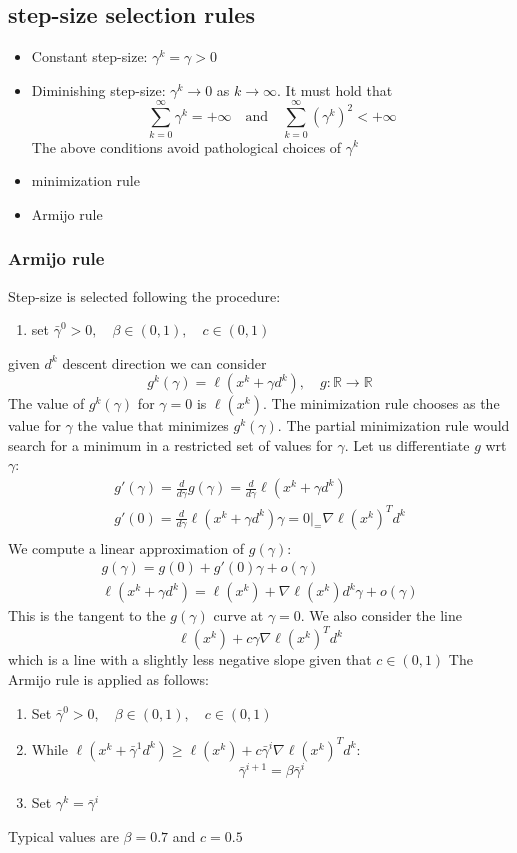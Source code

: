 \documentclass{book}
\newcommand\at[2]{\left.#1\right|_{#2}}
\newcommand{\R}{\mathbb{R}}
\theoremstyle{definition}
\theoremstyle{remark}
\theoremstyle{remark}
\begin{document}
\subsection{step-size selection rules}
\begin{itemize}
    \item Constant step-size: $\gamma^k=\gamma>0$
    \item Diminishing step-size: $\gamma^k\to 0$ as $k\to\infty$. It must hold that \[
            \displaystyle\sum_{k=0}^{\infty}\gamma^k = +\infty \quad \text{and} \quad \displaystyle\sum_{k=0}^{\infty}(\gamma^k)^2 < +\infty
        \]
        The above conditions avoid pathological choices of $\gamma^k$
    \item minimization rule
    \item Armijo rule
\end{itemize}

\subsubsection{Armijo rule}
Step-size is selected following the procedure: 
\begin{enumerate}
    \item set $\bar{\gamma}^0>0,\quad \beta\in(0,1),\quad c\in(0,1)$
\end{enumerate}
given $d^k$ descent direction we can consider 
\[
    g^k(\gamma) = \ell(x^k+\gamma d^k), \quad g:\R\to\R
\]
The value of $g^k(\gamma)$ for $\gamma=0$ is $\ell(x^k)$. The minimization rule chooses as the value for $\gamma$ the value that minimizes $g^k(\gamma)$. The partial minimization rule would search for a minimum in a restricted set of values for $\gamma$. Let us differentiate $g$ wrt $\gamma$:
\begin{gather*}
    g'(\gamma)=\displaystyle\frac{d}{d\gamma}g(\gamma)=\displaystyle\frac{d}{d\gamma}\ell(x^k+\gamma d^k)\\
    g'(0) = \displaystyle\frac{d}{d\gamma}\ell(x^k+\gamma d^k)\at{\gamma=0} = \nabla \ell(x^k)^Td^k\\
\end{gather*}
We compute a linear approximation of $g(\gamma)$:
\begin{gather*}
    g(\gamma) = g(0) + g'(0)\gamma+o(\gamma)\\
    \ell(x^k+\gamma d^k) = \ell(x^k)+\nabla\ell(x^k)d^k \gamma + o(\gamma)
\end{gather*}
This is the tangent to the $g(\gamma)$ curve at $\gamma=0$. We also consider the line 
\[
    \ell(x^k)+c\gamma\nabla\ell(x^k)^Td^k
\]
which is a line with a slightly less negative slope given that $c\in(0,1)$
The Armijo rule is applied as follows: 
\begin{enumerate}
    \item Set $\bar{\gamma}^0>0,\quad\beta\in(0,1),\quad c\in(0,1)$
    \item While $\ell(x^k+\bar{\gamma}^1d^k)\geq \ell(x^k)+c\bar{\gamma}^i\nabla\ell(x^k)^Td^k$:
        \[
            \bar{\gamma}^{i+1}=\beta\bar{\gamma}^i
        \]
    \item Set $\gamma^k = \bar{\gamma}^i$
\end{enumerate}
Typical values are $\beta=0.7$ and $c=0.5$
\end{document}
